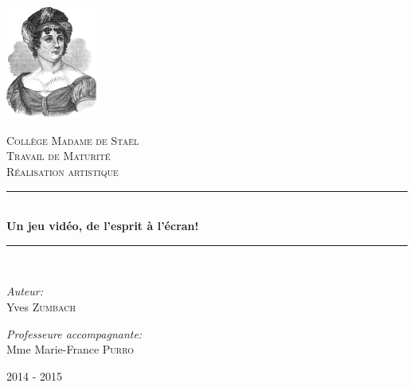 \begin{titlepage}

\newcommand{\HRule}{\rule{\linewidth}{0.5mm}}

\center 



\vspace*{-2.5cm}
\includegraphics[width=3cm]{./images/madame_de_stael.jpg}

\textsc{\LARGE Collège Madame de Staël}\\[1cm]

\textsc{\Large Travail de Maturité}\\[0.3cm]
\textsc{\large Réalisation artistique}\\[1cm]




\HRule \\[0.9cm]
{\huge \bfseries Un jeu vidéo, de l'esprit à l'écran!}\\[0.6cm]
\HRule \\[1.5cm]


\large{
\hspace{.05\textwidth}\begin{minipage}{0.45\textwidth}
\begin{flushleft} \large
\emph{Auteur:}\\
Yves \textsc{Zumbach} %
\end{flushleft}
\end{minipage}\hfill\begin{minipage}{0.35\textwidth}
\begin{flushleft} \large
\emph{Professeure accompagnante:} \\
Mme Marie-France \textsc{Purro} %
\end{flushleft}
\end{minipage}}
\hspace{.05\textwidth}

\vfill






{\large 2014 - 2015}\\[2cm]


\end{titlepage}
